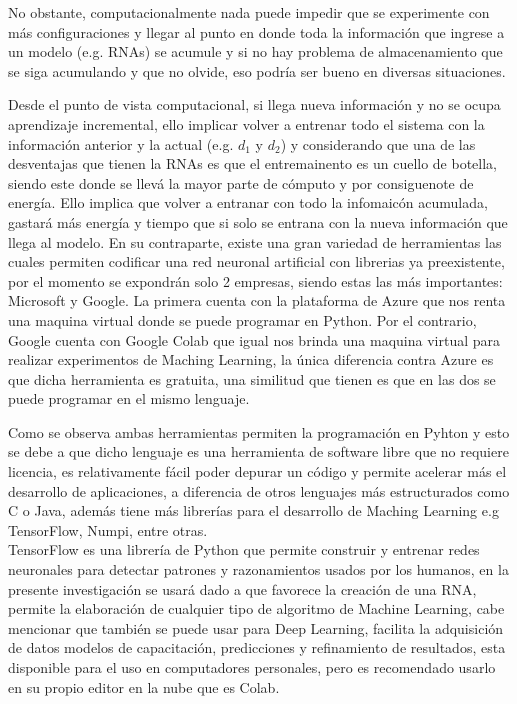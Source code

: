 No obstante,  computacionalmente nada puede 
        impedir que se experimente con más configuraciones y llegar al punto en donde toda la información 
        que ingrese a un modelo (e.g. RNAs) se acumule y si no hay problema de almacenamiento que se siga acumulando y que no olvide, 
        eso podría ser bueno en diversas situaciones.

Desde el punto de vista computacional, si llega nueva información y no se ocupa aprendizaje incremental, ello implicar volver a entrenar todo el sistema con la información anterior y la actual (e.g. $d_{1}$ y $d_{2}$) y considerando que una de las desventajas que tienen la RNAs es que el entremainento es un cuello de botella, siendo este donde se llevá la mayor parte de cómputo y por consiguenote de energía. Ello implica que volver a entranar con todo la infomaicón acumulada, gastará más energía y tiempo que si solo se entrana con la nueva información que llega al modelo.
 En su contraparte,  existe una gran variedad de herramientas las cuales permiten codificar una red neuronal artificial con librerias ya preexistente, por el momento se expondrán solo 2 empresas, siendo estas las más 
        importantes: Microsoft y Google. La primera cuenta con la plataforma de Azure que nos renta una maquina virtual donde se puede 
        programar en Python.  Por el contrario, Google cuenta con Google Colab que igual nos brinda una maquina virtual para realizar experimentos de Maching
        Learning, la \'unica diferencia contra Azure es que dicha herramienta es gratuita, una similitud que tienen es que en las dos se puede programar en el mismo lenguaje.


        Como se observa ambas herramientas permiten la programaci\'on en Pyhton y esto se debe a que dicho lenguaje es una herramienta de 
        software libre que no requiere licencia, es relativamente fácil poder depurar un código y permite acelerar 
        más el desarrollo de aplicaciones,  a diferencia de otros lenguajes más estructurados 
        como C o Java, adem\'as tiene m\'as librerías para el desarrollo de Maching Learning e.g TensorFlow, Numpi, entre otras. \\

        TensorFlow es una librería de Python que permite construir y entrenar redes neuronales para detectar patrones y
        razonamientos usados por los humanos, en la presente investigaci\'on se usar\'a dado a que favorece la creaci\'on de una RNA,
        permite la elaboraci\'on de cualquier tipo de algoritmo de Machine Learning, cabe mencionar que también se puede usar para Deep Learning, facilita la adquisici\'on de datos
        modelos de capacitaci\'on, predicciones y refinamiento de resultados, esta disponible para el uso en computadores personales, pero
        es recomendado usarlo en su propio editor en la nube que es Colab. \\ 

